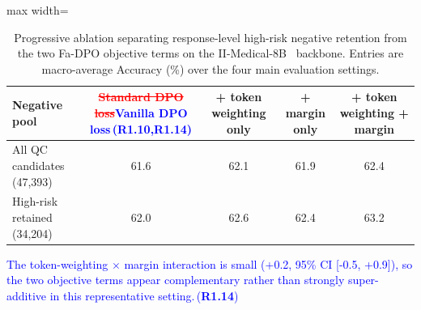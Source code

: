 \documentclass[a4paper,fleqn,doubleblind]{cas-sc}
\DeclareRobustCommand{\deleted}[1]{\textcolor{red}{\sout{#1}}}
\DeclareRobustCommand{\added}[1]{\textcolor{blue}{#1}}
\DeclareRobustCommand{\revtag}[1]{\textcolor{blue}{\scriptsize\,(\textbf{#1})}}
\begin{document}
\begin{table}[htbp]
    \centering
    \begingroup\color{blue}
    \renewcommand{\arraystretch}{1.1}
    \footnotesize
    \caption[Progressive ablation of negative filtering and objective modules.]{Progressive ablation separating response-level high-risk negative retention from the two Fa-DPO objective terms on the II-Medical-8B~\cite{intelligentinternet2025iimedical8b} backbone. Entries are macro-average Accuracy (\%) over the four main evaluation settings.}
    \label{tab:ablation_objective_matrix}
    \begin{adjustbox}{max width=\textwidth}
        \begin{tabular}{lcccc}
            \toprule
            \textbf{Negative pool} & \textbf{\deleted{Standard DPO loss}\added{Vanilla DPO loss}\revtag{R1.10,R1.14}} & \textbf{+ token weighting only} & \textbf{+ margin only} & \textbf{+ token weighting + margin} \\
            \midrule
            All QC candidates (47,393) & 61.6 & 62.1 & 61.9 & 62.4 \\
            High-risk retained (34,204) & 62.0 & 62.6 & 62.4 & 63.2 \\
            \bottomrule
        \end{tabular}
    \end{adjustbox}
    \endgroup
\end{table}

\added{The token-weighting $\times$ margin interaction is small (+0.2, 95\% CI [-0.5, +0.9]), so the two objective terms appear complementary rather than strongly super-additive in this representative setting.}\revtag{R1.14}
\end{document}
